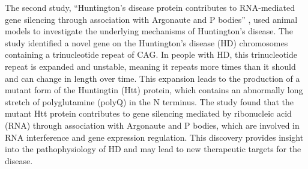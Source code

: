 \documentclass[10pt]{article}
\begin{document}
\begin{sloppypar}
  The second study, “Huntington’s disease protein contributes to RNA-mediated gene silencing through association with Argonaute and P bodies” \citep{savas_huntingtons_2008}, used animal models to investigate the underlying mechanisms of Huntington’s disease. The study identified a novel gene on the Huntington’s disease (HD) chromosomes containing a trinucleotide repeat of CAG. In people with HD, this trinucleotide repeat is expanded and unstable, meaning it repeats more times than it should and can change in length over time. This expansion leads to the production of a mutant form of the Huntingtin (Htt) protein, which contains an abnormally long stretch of polyglutamine (polyQ) in the N terminus. The study found that the mutant Htt protein contributes to gene silencing mediated by ribonucleic acid (RNA) through association with Argonaute and P bodies, which are involved in RNA interference and gene expression regulation. This discovery provides insight into the pathophysiology of HD and may lead to new therapeutic targets for the disease.


\end{sloppypar}
\end{document}
